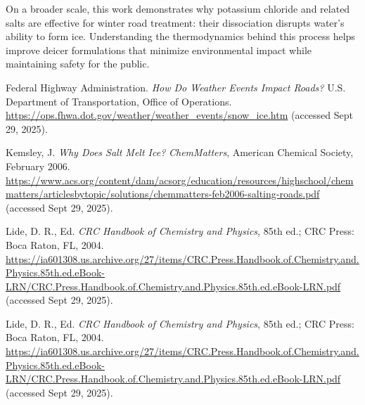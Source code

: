 \documentclass[11pt,letterpaper]{article}
\begin{document}
On a broader scale, this work demonstrates why potassium chloride and related salts are effective for winter road treatment: their dissociation disrupts water’s ability to form ice. Understanding the thermodynamics behind this process helps improve deicer formulations that minimize environmental impact while maintaining safety for the public.

\newpage
{}

\begin{thebibliography}{9}

 Federal Highway Administration. \textit{How Do Weather Events Impact Roads?} U.S. Department of Transportation, Office of Operations. \url{https://ops.fhwa.dot.gov/weather/weather\_events/snow\_ice.htm} (accessed Sept 29, 2025).

 Kemsley, J. \textit{Why Does Salt Melt Ice?} \textit{ChemMatters}, American Chemical Society, February 2006. \url{https://www.acs.org/content/dam/acsorg/education/resources/highschool/chemmatters/articlesbytopic/solutions/chemmatters-feb2006-salting-roads.pdf} (accessed Sept 29, 2025).

 Lide, D. R., Ed. \textit{CRC Handbook of Chemistry and Physics}, 85th ed.; CRC Press: Boca Raton, FL, 2004. \url{https://ia601308.us.archive.org/27/items/CRC.Press.Handbook.of.Chemistry.and.Physics.85th.ed.eBook-LRN/CRC.Press.Handbook.of.Chemistry.and.Physics.85th.ed.eBook-LRN.pdf} (accessed Sept 29, 2025).

 Lide, D. R., Ed. \textit{CRC Handbook of Chemistry and Physics}, 85th ed.; CRC Press: Boca Raton, FL, 2004. \url{https://ia601308.us.archive.org/27/items/CRC.Press.Handbook.of.Chemistry.and.Physics.85th.ed.eBook-LRN/CRC.Press.Handbook.of.Chemistry.and.Physics.85th.ed.eBook-LRN.pdf} (accessed Sept 29, 2025).

\end{thebibliography}
\end{document}
